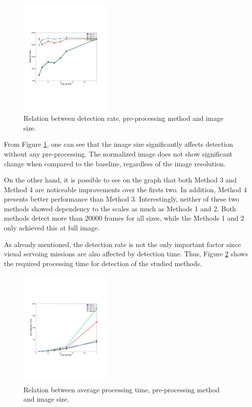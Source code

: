 \documentclass[conference, letterpaper]{IEEEtran}
\begin{document}
\begin{figure}[!ht]
	\centering
    \includegraphics[width=0.4\textwidth, trim={1.6cm 6.9cm 2.3cm 6.7cm}]{./fig/detection_rate_emb.pdf}
    \caption{Relation between detection rate, pre-processing method and image size.}
	\label{fig:detection_rate}
\end{figure}

From Figure \ref{fig:detection_rate}, one can see that the image size
significantly affects detection without any pre-processing.
The normalized image does not show significant change when compared to the
baseline, regardless of the image resolution.

On the other hand, it is possible to see on the graph that both Method 3 and
Method 4 are noticeable improvements over the firsts two. In addition, Method 4 presents better performance
than Method 3. Interestingly, neither of these two methods showed dependency to
the scales as much as Methods 1 and 2. Both methods detect more than
20000 frames for all sizes, while the Methods 1 and 2 only achieved this at
full image. 

As already mentioned, the detection rate is not the only important factor since
visual servoing missions are also affected by detection time. Thus, Figure
\ref{fig:processing_time} shows the required processing time for detection of
the studied methods.

\begin{figure}[!ht]
	\centering
    \includegraphics[width=0.4\textwidth, trim={1.6cm 6.9cm 2.3cm 6.7cm}]{./fig/detection_time_emb.pdf}
    \caption{Relation between average processing time, pre-processing method and image size.}
	\label{fig:processing_time}
\end{figure}
\end{document}
